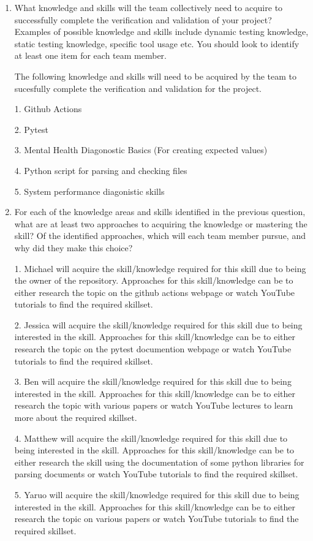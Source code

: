 \documentclass[12pt, titlepage]{article}
\begin{document}
\begin{enumerate}
  \item What knowledge and skills will the team collectively need to acquire to
  successfully complete the verification and validation of your project?
  Examples of possible knowledge and skills include dynamic testing knowledge,
  static testing knowledge, specific tool usage etc.  You should look to
  identify at least one item for each team member.

The following knowledge and skills will need to be acquired by the team to sucesfully
complete the verification and validation for the project.

1. Github Actions

2. Pytest

3. Mental Health Diagonostic Basics (For creating expected values)

4. Python script for parsing and checking files

5. System performance diagonistic skills

  \item For each of the knowledge areas and skills identified in the previous
  question, what are at least two approaches to acquiring the knowledge or
  mastering the skill?  Of the identified approaches, which will each team
  member pursue, and why did they make this choice?

1. Michael will acquire the skill/knowledge required for this skill due to being
the owner of the repository. Approaches for this skill/knowledge can be to either
research the topic on the github actions webpage or watch YouTube tutorials to
find the required skillset.

2. Jessica will acquire the skill/knowledge required for this skill due to being
interested in the skill. Approaches for this skill/knowledge can be to either
research the topic on the pytest documention webpage or watch YouTube tutorials to
find the required skillset.

3. Ben will acquire the skill/knowledge required for this skill due to being
interested in the skill. Approaches for this skill/knowledge can be to either
research the topic with various papers or watch YouTube lectures to
learn more about the required skillset.

4. Matthew will acquire the skill/knowledge required for this skill due to being
interested in the skill. Approaches for this skill/knowledge can be to either
research the skill using the documentation of
some python libraries for parsing documents or watch YouTube tutorials to
find the required skillset.

5. Yaruo will acquire the skill/knowledge required for this skill due to being
interested in the skill. Approaches for this skill/knowledge can be to either
research the topic on various papers or watch YouTube tutorials to
find the required skillset.
\end{enumerate}
\end{document}
